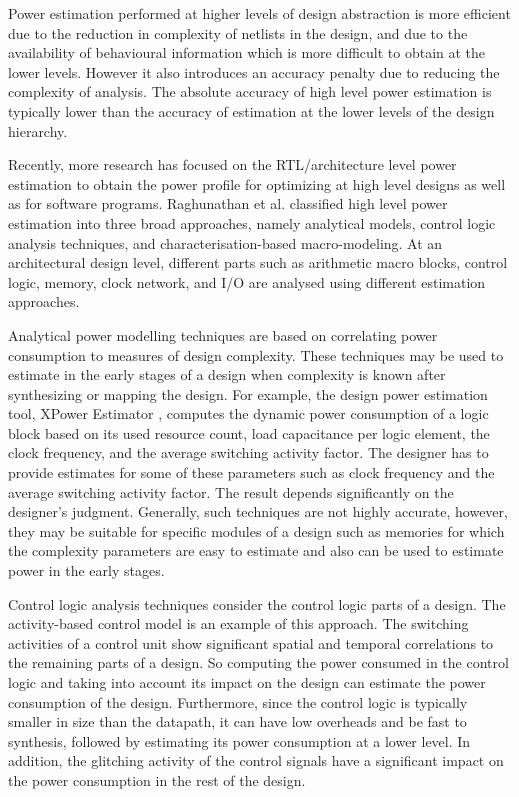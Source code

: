 Power estimation performed at higher levels of design abstraction is more efficient due to the reduction in complexity of netlists in the design, and due to the availability of behavioural information which is more difficult to obtain at the lower levels.
However it also introduces an accuracy penalty due to reducing the complexity of analysis.
The absolute accuracy of high level power estimation is typically lower than the accuracy of estimation at the lower levels of the design hierarchy. 

Recently, more research has focused on the RTL/architecture level power estimation to obtain the power profile for optimizing at high level designs as well as for software programs. Raghunathan et al. \cite{Raghunathan2003} classified high level power estimation into three broad approaches, namely analytical models, control logic analysis techniques, and characterisation-based macro-modeling. 
At an architectural design level, different parts such as arithmetic macro blocks, control logic, memory, clock network, and I/O are analysed using different estimation approaches. 

Analytical power modelling techniques are based on correlating power consumption to measures of design complexity. These techniques may be used to estimate in the early stages of a design when complexity is known after synthesizing or mapping the design.  
For example, the design power estimation tool, XPower Estimator \cite{XPowerEstimator2011},  computes the dynamic power consumption of a logic block based on its used resource count, load capacitance per logic element, the clock frequency, and the average switching activity factor.
The designer has to provide estimates for some of these parameters such as clock frequency and the average switching activity factor. 
The result depends significantly on the designer's judgment.
Generally, such techniques are not highly accurate, however, they may be suitable for specific modules of a design such as memories for which the complexity parameters are easy to estimate and also can be used to estimate power in the early stages. 

Control logic analysis techniques consider the control logic parts of a design. The activity-based control model \cite{Landman1996} is an example of this approach.
The switching activities of a control unit show significant spatial and temporal correlations to the remaining parts of a design. 
So computing the power consumed in the control logic and taking into account its impact on the design can estimate the power consumption of the design. 
Furthermore, since the control logic is typically smaller in size than the datapath, it can have low overheads and be fast to synthesis, followed by estimating its power consumption at a lower level. 
In addition, the glitching activity of the control signals have a significant impact on the power consumption in the rest of the design.

